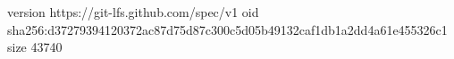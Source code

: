 version https://git-lfs.github.com/spec/v1
oid sha256:d37279394120372ac87d75d87c300c5d05b49132caf1db1a2dd4a61e455326c1
size 43740
